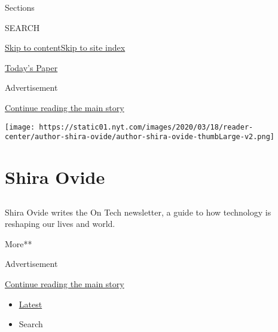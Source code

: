Sections

SEARCH

\protect\hyperlink{site-content}{Skip to
content}\protect\hyperlink{site-index}{Skip to site index}

\href{https://myaccount.nytimes.com/auth/login?response_type=cookie\&client_id=vi}{}

\href{https://www.nytimes.com/section/todayspaper}{Today's Paper}

Advertisement

\protect\hyperlink{after-top}{Continue reading the main story}

\texttt{[image: https://static01.nyt.com/images/2020/03/18/reader-center/author-shira-ovide/author-shira-ovide-thumbLarge-v2.png]}

\hypertarget{shira-ovide}{%
\section{Shira Ovide}\label{shira-ovide}}

\subsection{}

Shira Ovide writes the On Tech newsletter, a guide to how technology is
reshaping our lives and world.

More**

Advertisement

\protect\hyperlink{after-mid1}{Continue reading the main story}

\begin{itemize}
\tightlist
\item
  \protect\hyperlink{stream-panel}{Latest}
\item
  Search
\end{itemize}

